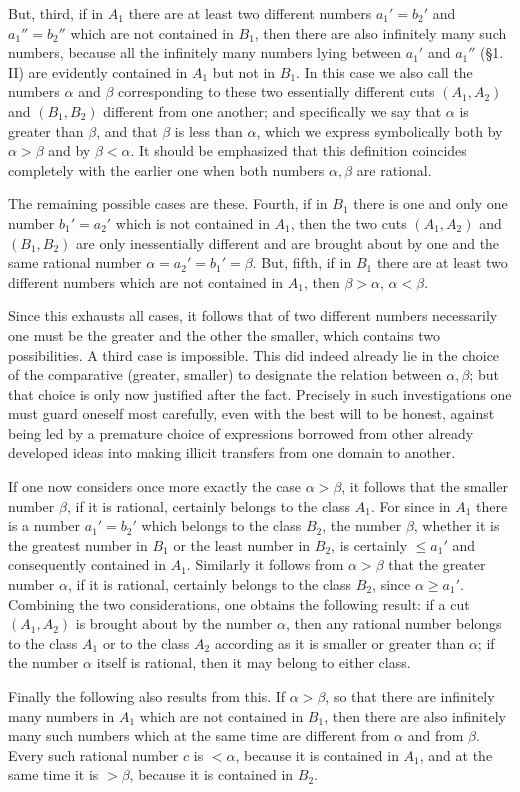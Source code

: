 \documentclass[11pt]{article}
\begin{document}
But, third, if in $A_1$ there are at least two different numbers $a_1'=b_2'$ and $a_1''=b_2''$ which are not contained in $B_1$, then there are also infinitely many such numbers, because all the infinitely many numbers lying between $a_1'$ and $a_1''$ (\S 1. II) are evidently contained in $A_1$ but not in $B_1$. In this case we also call the numbers $\alpha$ and $\beta$ corresponding to these two essentially different cuts $(A_1,A_2)$ and $(B_1,B_2)$ different from one another; and specifically we say that $\alpha$ is greater than $\beta$, and that $\beta$ is less than $\alpha$, which we express symbolically both by $\alpha>\beta$ and by $\beta<\alpha$. It should be emphasized that this definition coincides completely with the earlier one when both numbers $\alpha,\beta$ are rational.

The remaining possible cases are these. Fourth, if in $B_1$ there is one and only one number $b_1'=a_2'$ which is not contained in $A_1$, then the two cuts $(A_1,A_2)$ and $(B_1,B_2)$ are only inessentially different and are brought about by one and the same rational number $\alpha=a_2'=b_1'=\beta$. But, fifth, if in $B_1$ there are at least two different numbers which are not contained in $A_1$, then $\beta>\alpha$, $\alpha<\beta$.

Since this exhausts all cases, it follows that of two different numbers necessarily one must be the greater and the other the smaller, which contains two possibilities. A third case is impossible. This did indeed already lie in the choice of the comparative (greater, smaller) to designate the relation between $\alpha,\beta$; but that choice is only now justified after the fact. Precisely in such investigations one must guard oneself most carefully, even with the best will to be honest, against being led by a premature choice of expressions borrowed from other already developed ideas into making illicit transfers from one domain to another.

If one now considers once more exactly the case $\alpha>\beta$, it follows that the smaller number $\beta$, if it is rational, certainly belongs to the class $A_1$. For since in $A_1$ there is a number $a_1'=b_2'$ which belongs to the class $B_2$, the number $\beta$, whether it is the greatest number in $B_1$ or the least number in $B_2$, is certainly $\leq a_1'$ and consequently contained in $A_1$. Similarly it follows from $\alpha>\beta$ that the greater number $\alpha$, if it is rational, certainly belongs to the class $B_2$, since $\alpha\geq a_1'$. Combining the two considerations, one obtains the following result: if a cut $(A_1,A_2)$ is brought about by the number $\alpha$, then any rational number belongs to the class $A_1$ or to the class $A_2$ according as it is smaller or greater than $\alpha$; if the number $\alpha$ itself is rational, then it may belong to either class.

Finally the following also results from this. If $\alpha>\beta$, so that there are infinitely many numbers in $A_1$ which are not contained in $B_1$, then there are also infinitely many such numbers which at the same time are different from $\alpha$ and from $\beta$. Every such rational number $c$ is $<\alpha$, because it is contained in $A_1$, and at the same time it is $>\beta$, because it is contained in $B_2$.
\end{document}
